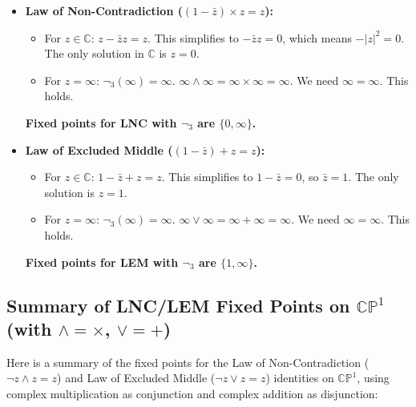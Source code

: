 \documentclass{article}
\begin{document}
	\begin{itemize}
		\item \textbf{Law of Non-Contradiction ($(1 - \bar{z}) \times z = z$):}
		\begin{itemize}
			\item For $z \in \mathbb{C}$: $z - \bar{z}z = z$. This simplifies to $-\bar{z}z = 0$, which means $-|z|^2 = 0$. The only solution in $\mathbb{C}$ is $z = 0$.
			\item For $z = \infty$: $\neg_3(\infty) = \infty$. $\infty \wedge \infty = \infty \times \infty = \infty$. We need $\infty = \infty$. This holds.
		\end{itemize}
		\textbf{Fixed points for LNC with $\neg_3$ are $\{0, \infty\}$.}
		
		\item \textbf{Law of Excluded Middle ($(1 - \bar{z}) + z = z$):}
		\begin{itemize}
			\item For $z \in \mathbb{C}$: $1 - \bar{z} + z = z$. This simplifies to $1 - \bar{z} = 0$, so $\bar{z} = 1$. The only solution is $z = 1$.
			\item For $z = \infty$: $\neg_3(\infty) = \infty$. $\infty \vee \infty = \infty + \infty = \infty$. We need $\infty = \infty$. This holds.
		\end{itemize}
		\textbf{Fixed points for LEM with $\neg_3$ are $\{1, \infty\}$.}
	\end{itemize}
	
	\subsection{Summary of LNC/LEM Fixed Points on $\mathbb{CP}^1$ (with $\wedge=\times$, $\vee=+$)}
	
	Here is a summary of the fixed points for the Law of Non-Contradiction ($\neg z \wedge z = z$) and Law of Excluded Middle ($\neg z \vee z = z$) identities on $\mathbb{CP}^1$, using complex multiplication as conjunction and complex addition as disjunction:
	
\end{document}
